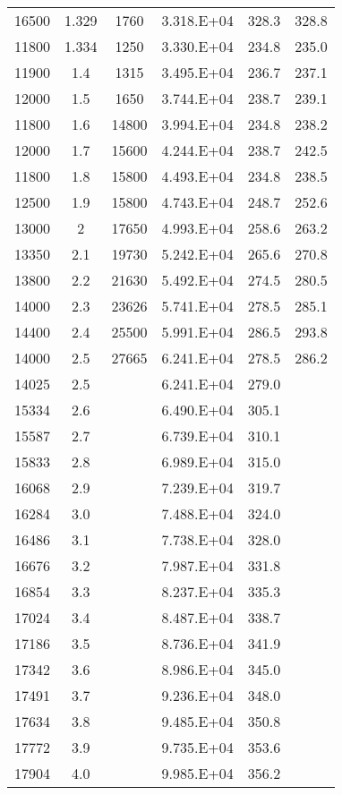 \begin{longtable}{cccccc}
  16500 & 1.329 & 1760 & 3.318.E+04 & 328.3 & 328.8 \\
  11800 & 1.334 & 1250 & 3.330.E+04 & 234.8 & 235.0 \\
  11900 & 1.4 & 1315 & 3.495.E+04 & 236.7 & 237.1 \\
  12000 & 1.5 & 1650 & 3.744.E+04 & 238.7 & 239.1 \\
  11800 & 1.6 & 14800 & 3.994.E+04 & 234.8 & 238.2 \\
  12000 & 1.7 & 15600 & 4.244.E+04 & 238.7 & 242.5 \\
  11800 & 1.8 & 15800 & 4.493.E+04 & 234.8 & 238.5 \\
  12500 & 1.9 & 15800 & 4.743.E+04 & 248.7 & 252.6 \\
  13000 & 2 & 17650 & 4.993.E+04 & 258.6 & 263.2 \\
  13350 & 2.1 & 19730 & 5.242.E+04 & 265.6 & 270.8 \\
  13800 & 2.2 & 21630 & 5.492.E+04 & 274.5 & 280.5 \\
  14000 & 2.3 & 23626 & 5.741.E+04 & 278.5 & 285.1 \\
  14400 & 2.4 & 25500 & 5.991.E+04 & 286.5 & 293.8 \\
  14000 & 2.5 & 27665 & 6.241.E+04 & 278.5 & 286.2 \\
  14025 & 2.5 &  & 6.241.E+04 & 279.0 &  \\
  15334 & 2.6 &  & 6.490.E+04 & 305.1 &  \\
  15587 & 2.7 &  & 6.739.E+04 & 310.1 &  \\
  15833 & 2.8 &  & 6.989.E+04 & 315.0 &  \\
  16068 & 2.9 &  & 7.239.E+04 & 319.7 &  \\
  16284 & 3.0 &  & 7.488.E+04 & 324.0 &  \\
  16486 & 3.1 &  & 7.738.E+04 & 328.0 &  \\
  16676 & 3.2 &  & 7.987.E+04 & 331.8 &  \\
  16854 & 3.3 &  & 8.237.E+04 & 335.3 &  \\
  17024 & 3.4 &  & 8.487.E+04 & 338.7 &  \\
  17186 & 3.5 &  & 8.736.E+04 & 341.9 &  \\
  17342 & 3.6 &  & 8.986.E+04 & 345.0 &  \\
  17491 & 3.7 &  & 9.236.E+04 & 348.0 &  \\
  17634 & 3.8 &  & 9.485.E+04 & 350.8 &  \\
  17772 & 3.9 &  & 9.735.E+04 & 353.6 &  \\
  17904 & 4.0 &  & 9.985.E+04 & 356.2 &  \\

\end{longtable}
